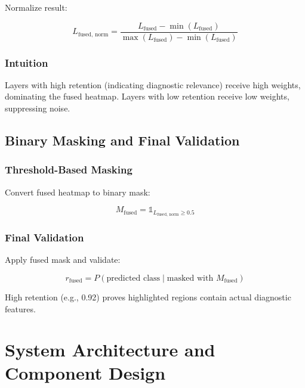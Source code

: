 \documentclass[12pt,a4paper,oneside]{book}
\begin{document}
Normalize result:

\begin{equation}
L_{\text{fused, norm}} = \frac{L_{\text{fused}} - \min(L_{\text{fused}})}{\max(L_{\text{fused}}) - \min(L_{\text{fused}})}
\end{equation}

\subsection{Intuition}

Layers with high retention (indicating diagnostic relevance) receive high weights, dominating the fused heatmap. Layers with low retention receive low weights, suppressing noise.

\section{Binary Masking and Final Validation}

\subsection{Threshold-Based Masking}

Convert fused heatmap to binary mask:

\begin{equation}
M_{\text{fused}} = \mathbb{1}_{L_{\text{fused, norm}} \geq 0.5}
\end{equation}

\subsection{Final Validation}

Apply fused mask and validate:

\begin{equation}
r_{\text{fused}} = P(\text{predicted class} \mid \text{masked with } M_{\text{fused}})
\end{equation}

High retention (e.g., 0.92) proves highlighted regions contain actual diagnostic features.

\chapter{System Architecture and Component Design}
\label{ch:architecture}
\end{document}
